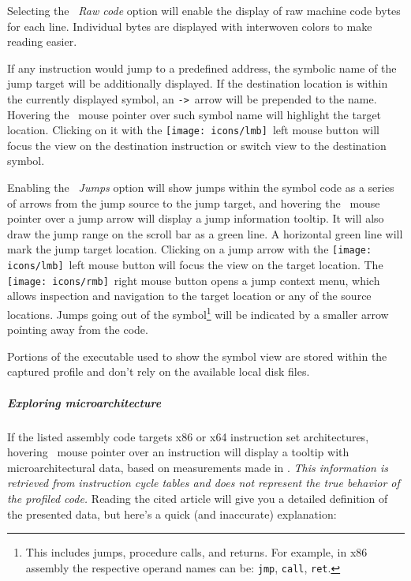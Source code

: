 \documentclass[hidelinks,titlepage,a4paper,twoside]{article}
\newcommand{\LMB}{\texttt{[image: icons/lmb]}}
\newcommand{\RMB}{\texttt{[image: icons/rmb]}}
\begin{document}
Selecting the \emph{\faCogs{}~Raw code} option will enable the display of raw machine code bytes for each line. Individual bytes are displayed with interwoven colors to make reading easier.

If any instruction would jump to a predefined address, the symbolic name of the jump target will be additionally displayed. If the destination location is within the currently displayed symbol, an \texttt{->}~arrow will be prepended to the name. Hovering the \faMousePointer{}~mouse pointer over such symbol name will highlight the target location. Clicking on it with the \LMB{}~left mouse button will focus the view on the destination instruction or switch view to the destination symbol.

Enabling the \emph{\faShare{}~Jumps} option will show jumps within the symbol code as a series of arrows from the jump source to the jump target, and hovering the \faMousePointer{}~mouse pointer over a jump arrow will display a jump information tooltip. It will also draw the jump range on the scroll bar as a green line. A horizontal green line will mark the jump target location. Clicking on a jump arrow with the \LMB{}~left mouse button will focus the view on the target location. The \RMB{}~right mouse button opens a jump context menu, which allows inspection and navigation to the target location or any of the source locations. Jumps going out of the symbol\footnote{This includes jumps, procedure calls, and returns. For example, in x86 assembly the respective operand names can be: \texttt{jmp}, \texttt{call}, \texttt{ret}.} will be indicated by a smaller arrow pointing away from the code.

Portions of the executable used to show the symbol view are stored within the captured profile and don't rely on the available local disk files.

\subparagraph{Exploring microarchitecture}

If the listed assembly code targets x86 or x64 instruction set architectures, hovering \faMousePointer{}~mouse pointer over an instruction will display a tooltip with microarchitectural data, based on measurements made in \cite{Abel19a}. \emph{This information is retrieved from instruction cycle tables and does not represent the true behavior of the profiled code.} Reading the cited article will give you a detailed definition of the presented data, but here's a quick (and inaccurate) explanation:
\end{document}
